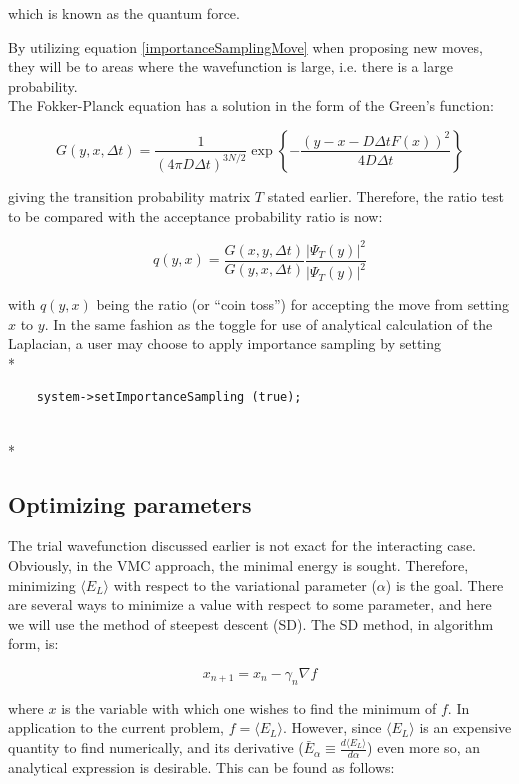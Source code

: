 \documentclass[english, a4paper]{article}
\begin{document}
which is known as the quantum force.

By utilizing equation \eqref{importanceSamplingMove} when proposing new moves, they will be to areas where the wavefunction is large, i.e. there is a large probability.\\
The Fokker-Planck equation has a solution in the form of the Green's function:

\begin{equation}
 G(y,x,\Delta t) = \frac{1}{(4\pi D\Delta t)^{3N/2}}\exp\left\{-\frac{(y-x-D\Delta tF(x))^2}{4D\Delta t}\right\}
\end{equation}

giving the transition probability matrix $T$ stated earlier. Therefore, the ratio test to be compared with the acceptance probability ratio is now:

\begin{equation}
 q(y,x) = \frac{G(x,y,\Delta t)}{G(y,x,\Delta t)}\frac{|\Psi_T(y)|^2}{|\Psi_T(y)|^2}
\end{equation}

with $q(y,x)$ being the ratio (or ``coin toss'') for accepting the move from setting $x$ to $y$.
In the same fashion as the toggle for use of analytical calculation of the Laplacian, a user may choose to apply importance sampling by setting 
\\*

\begin{verbatim}
	system->setImportanceSampling (true);
\end{verbatim}
\\*


\subsection{Optimizing parameters}
The trial wavefunction discussed earlier is not exact for the interacting case. 
Obviously, in the VMC approach, the minimal energy is sought. Therefore, minimizing $\langle E_L\rangle$ with respect to the variational parameter ($\alpha$) is the goal.
There are several ways to minimize a value with respect to some parameter, and here we will use the method of steepest descent (SD). The SD method, in algorithm form, is:

\begin{equation}
x_{n+1} = x_n - \gamma_n\nabla f
\end{equation}

where $x$ is the variable with which one wishes to find the minimum of $f$. In application to the current problem, $f = \langle E_L\rangle$. However, since $\langle E_L\rangle$ is an expensive quantity to find numerically, and its derivative ($\bar{E}_\alpha \equiv \frac{d\langle E_L\rangle}{d\alpha}$) even more so, an analytical expression is desirable. This can be found as follows:
\end{document}
